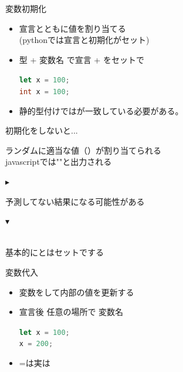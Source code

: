 \documentclass[dvipdfmx]{beamer}
\begin{document}
  \begin{frame}{変数}{初期化}
    \begin{itemize}
      \setlength{\itemsep}{2mm}
      \item 宣言とともに値を割り当てる\\
      (pythonでは宣言と初期化がセット)
      \item 型 + 変数名 で宣言 + をセットで\\
      \begin{center}
        \lstinline[language=javascript]|let x = 100;|\\
        \lstinline[language=c]|int x = 100;|
      \end{center}
      \item 静的型付けではが一致している必要がある。\\
      \begin{center}
      \end{center}
    \end{itemize}
    \begin{large}初期化をしないと...\end{large}
    \begin{center}
      ランダムに適当な値（）が割り当てられる\\
      javascriptでは""と出力される\\
      \quad\begin{large}$\blacktriangleright$\end{large}予測してない結果になる可能性がある\\
      \begin{Large}$\blacktriangledown$\end{Large}\\
      基本的にとはセットでする
    \end{center}
  \end{frame}

  \begin{frame}{変数}{代入}
    \begin{itemize}
      \setlength{\itemsep}{5mm}
      \item 変数をして内部の値を更新する
      \item 宣言後 任意の場所で 変数名 \\
      \begin{center}
        \lstinline[language=javascript]|let x = 100;|\\
        \lstinline[language=javascript]|x = 200;|
      \end{center}
      \item =は実は
    \end{itemize}
  \end{frame}
\end{document}
